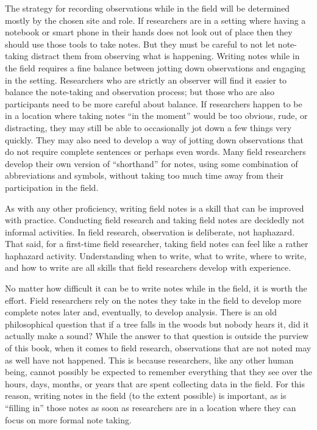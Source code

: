 The strategy for recording observations while in the field will be determined mostly by the chosen site and role. If researchers are in a setting where having a notebook or smart phone in their hands does not look out of place then they should use those tools to take notes. But they must be careful to not let note-taking distract them from observing what is happening. Writing notes while in the field requires a fine balance between jotting down observations and engaging in the setting. Researchers who are strictly an observer will find it easier to balance the note-taking and observation process; but those who are also participants need to be more careful about balance. If researchers happen to be in a location where taking notes ``in the moment'' would be too obvious, rude, or distracting, they may still be able to occasionally jot down a few things very quickly. They may also need to develop a way of jotting down observations that do not require complete sentences or perhaps even words. Many field researchers develop their own version of ``shorthand'' for notes, using some combination of abbreviations and symbols, without taking too much time away from their participation in the field.

As with any other proficiency, writing field notes is a skill that can be improved with practice. Conducting field research and taking field notes are decidedly not informal activities. In field research, observation is deliberate, not haphazard. That said, for a first-time field researcher, taking field notes can feel like a rather haphazard activity. Understanding when to write, what to write, where to write, and how to write are all skills that field researchers develop with experience.

No matter how difficult it can be to write notes while in the field, it is worth the effort. Field researchers rely on the notes they take in the field to develop more complete notes later and, eventually, to develop analysis. There is an old philosophical question that if a tree falls in the woods but nobody hears it, did it actually make a sound? While the answer to that question is outside the purview of this book, when it comes to field research, observations that are not noted may as well have not happened. This is because researchers, like any other human being, cannot possibly be expected to remember everything that they see over the hours, days, months, or years that are spent collecting data in the field. For this reason, writing notes in the field (to the extent possible) is important, as is ``filling in'' those notes as soon as researchers are in a location where they can focus on more formal note taking.

